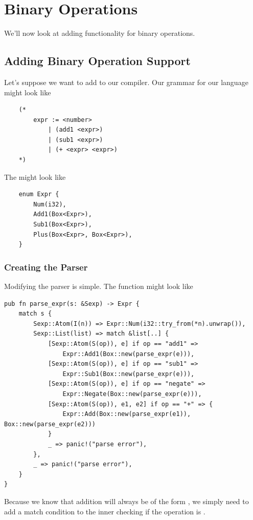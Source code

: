 \documentclass[letterpaper]{article}
\begin{document}
\section{Binary Operations}
We'll now look at adding functionality for binary operations. 

\subsection{Adding Binary Operation Support}
Let's suppose we want to add  to our compiler. Our grammar for our language might look like 
\begin{verbatim}
    (*
        expr := <number> 
            | (add1 <expr>)
            | (sub1 <expr>)
            | (+ <expr> <expr>) 
    *)\end{verbatim}
The   might look like 
\begin{verbatim}
    enum Expr {
        Num(i32),
        Add1(Box<Expr>),
        Sub1(Box<Expr>),
        Plus(Box<Expr>, Box<Expr>),
    }\end{verbatim} 

\subsubsection{Creating the Parser}
Modifying the parser is simple. The  function might look like 
\begin{verbatim}
pub fn parse_expr(s: &Sexp) -> Expr {
    match s {
        Sexp::Atom(I(n)) => Expr::Num(i32::try_from(*n).unwrap()),
        Sexp::List(list) => match &list[..] {
            [Sexp::Atom(S(op)), e] if op == "add1" => 
                Expr::Add1(Box::new(parse_expr(e))),
            [Sexp::Atom(S(op)), e] if op == "sub1" => 
                Expr::Sub1(Box::new(parse_expr(e))),
            [Sexp::Atom(S(op)), e] if op == "negate" => 
                Expr::Negate(Box::new(parse_expr(e))),
            [Sexp::Atom(S(op)), e1, e2] if op == "+" => {
                Expr::Add(Box::new(parse_expr(e1)), Box::new(parse_expr(e2)))
            }
            _ => panic!("parse error"),
        },
        _ => panic!("parse error"),
    }
}\end{verbatim}
Because we know that addition will always be of the form , we simply need to add a match condition to the inner  checking if the operation is \code{+}. 
\end{document}
